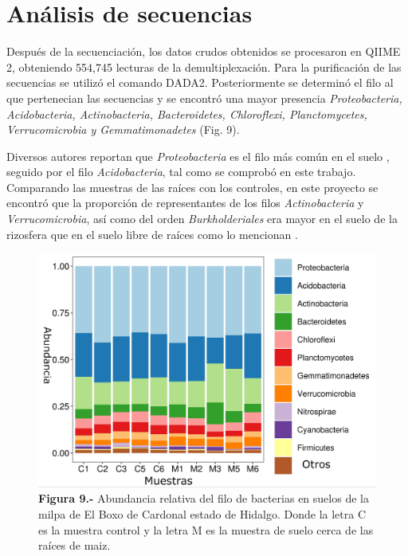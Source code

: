 \documentclass[12pt,letterpaper,oneside]{report}
\begin{document}
\section{Análisis de secuencias}
Después de la secuenciación, los datos crudos obtenidos se procesaron en QIIME 2, obteniendo 554,745 lecturas de la demultiplexación. Para la purificación de las secuencias se utilizó el comando DADA2. Posteriormente se determinó el filo al que pertenecian las secuencias y se encontró una mayor presencia \textit{Proteobacteria, Acidobacteria, Actinobacteria, Bacteroidetes, Chloroflexi, Planctomycetes, Verrucomicrobia y Gemmatimonadetes} (Fig. 9).
\par
Diversos autores reportan que \textit{Proteobacteria} es el filo más común en el suelo \autocite{Buckley2003,Janssen2006}, seguido por el filo \textit{Acidobacteria}, tal como se comprobó en este trabajo. Comparando  las muestras de las raíces  con los controles, en este proyecto se encontró que la proporción de representantes de los filos \textit{Actinobacteria} y \textit{Verrucomicrobia}, así como del orden \textit{Burkholderiales} era mayor en el suelo de la rizosfera que en el suelo libre de raíces como lo mencionan \autocite{Aguirre-von-Wobeser2018}. %
\begin{figure}[!h]
\centering
\includegraphics[width=16cm]{figuras/IMG_10}
\caption*{\textbf{Figura 9.-} Abundancia relativa del filo de bacterias en suelos de la milpa de El Boxo de Cardonal estado de Hidalgo. Donde la letra C es la muestra control y la letra M es la muestra de suelo cerca de las raíces de maiz.}
\label{Figura 10}
\end{figure}
\end{document}
